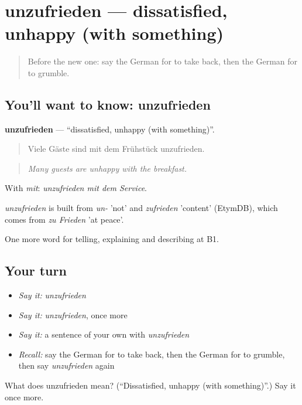 \section[unzufrieden]{unzufrieden — dissatisfied, unhappy (with something)}

\label{lesson:GE-C431-unzufrieden}



\begin{quote}
Before the new one: say the German for to take back, then the German for to grumble.
\end{quote}

\subsection*{You'll want to know: unzufrieden}
\textbf{unzufrieden} — \textquotedblleft{}dissatisfied, unhappy (with something)\textquotedblright{}.

\begin{quote}
Viele Gäste sind mit dem Frühstück unzufrieden.
\end{quote}

\begin{quote}
\emph{Many guests are unhappy with the breakfast.}
\end{quote}

With \emph{mit}: \emph{unzufrieden mit dem Service}.

\begin{cousinweb}
\emph{unzufrieden} is built from \emph{un-} 'not' and \emph{zufrieden} 'content' (EtymDB), which comes from \emph{zu Frieden} 'at peace'.
\end{cousinweb}

\begin{grammarlens}[title={What you've built}]
One more word for telling, explaining and describing at B1.
\end{grammarlens}

\subsection*{Your turn}
\begin{itemize}
\raggedright
  \item \emph{Say it:} \emph{unzufrieden}
  \item \emph{Say it:} \emph{unzufrieden}, once more
  \item \emph{Say it:} a sentence of your own with \emph{unzufrieden}
  \item \emph{Recall:} say the German for to take back, then the German for to grumble, then say \emph{unzufrieden} again
\end{itemize}

\begin{tcolorbox}[breakable,colback=teal!4,colframe=teal!35!black,title={Before you move on}]
What does unzufrieden mean? (\textquotedblleft{}Dissatisfied, unhappy (with something)\textquotedblright{}.) Say it once more.
\end{tcolorbox}
